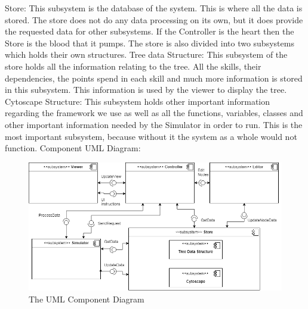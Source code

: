 \documentclass[12pt]{article}
\begin{document}
  Store:\newline
  This subsystem is the database of the system. This is where all the data is stored. The store does not do any data processing on its own, but it does provide the requested data for other subsystems. If the Controller is the heart then the Store is the blood that it pumps. The store is also divided into two subsystems which holds their own structures.\newline
  Tree data Structure:\newline 
  This subsystem of the store holds all the information relating to the tree. All the skills, their dependencies, the points spend in each skill and much more information is stored in this subsystem. This information is used by the viewer to display the tree.\newline
  Cytoscape Structure:\newline 
  This subsystem holds other important information regarding the framework we use as well as all the functions, variables, classes and other important information needed by the Simulator in order to run. This is the most important subsystem, because without it the system as a whole would not function.\newline \newline 
  Component UML Diagram:

  \begin{figure}[H]
    \includegraphics[width=\linewidth]{TriiUMLComponentDiagram}
    \caption{The UML Component Diagram}
    \label{fig:componentdiagram}
  \end{figure}
\end{document}
